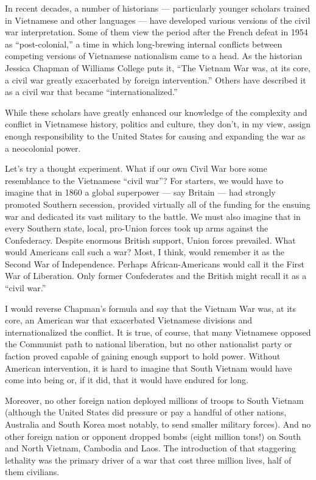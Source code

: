In recent decades, a number of historians --- particularly younger
scholars trained in Vietnamese and other languages --- have developed
various versions of the civil war interpretation. Some of them view the
period after the French defeat in 1954 as ``post-colonial,'' a time in
which long-brewing internal conflicts between competing versions of
Vietnamese nationalism came to a head. As the historian Jessica Chapman
of Williams College puts it, ``The Vietnam War was, at its core, a civil
war greatly exacerbated by foreign intervention.'' Others have described
it as a civil war that became ``internationalized.''

While these scholars have greatly enhanced our knowledge of the
complexity and conflict in Vietnamese history, politics and culture,
they don't, in my view, assign enough responsibility to the United
States for causing and expanding the war as a neocolonial power.

Let's try a thought experiment. What if our own Civil War bore some
resemblance to the Vietnamese ``civil war''? For starters, we would have
to imagine that in 1860 a global superpower --- say Britain --- had
strongly promoted Southern secession, provided virtually all of the
funding for the ensuing war and dedicated its vast military to the
battle. We must also imagine that in every Southern state, local,
pro-Union forces took up arms against the Confederacy. Despite enormous
British support, Union forces prevailed. What would Americans call such
a war? Most, I think, would remember it as the Second War of
Independence. Perhaps African-Americans would call it the First War of
Liberation. Only former Confederates and the British might recall it as
a ``civil war.''

I would reverse Chapman's formula and say that the Vietnam War was, at
its core, an American war that exacerbated Vietnamese divisions and
internationalized the conflict. It is true, of course, that many
Vietnamese opposed the Communist path to national liberation, but no
other nationalist party or faction proved capable of gaining enough
support to hold power. Without American intervention, it is hard to
imagine that South Vietnam would have come into being or, if it did,
that it would have endured for long.

Moreover, no other foreign nation deployed millions of troops to South
Vietnam (although the United States did pressure or pay a handful of
other nations, Australia and South Korea most notably, to send smaller
military forces). And no other foreign nation or opponent dropped bombs
(eight million tons!) on South and North Vietnam, Cambodia and Laos. The
introduction of that staggering lethality was the primary driver of a
war that cost three million lives, half of them civilians.


